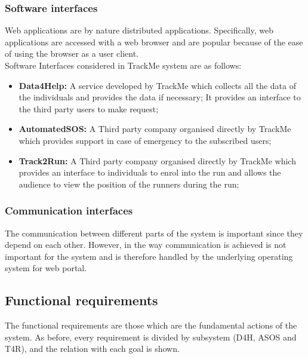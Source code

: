 \documentclass[12pt]{article}
\begin{document}
\subsubsection{Software interfaces}
Web applications are by nature distributed applications. Specifically, web applications are accessed with a web browser and are popular because of the ease of using the browser as a user client.\\
Software Interfaces considered in TrackMe system are as follows:
\begin{itemize}
\item{} \textbf{Data4Help:} A service developed by TrackMe which collects all the data of the individuals and provides the data if necessary; It provides an interface to the third party users to make request;
\item{} \textbf{AutomatedSOS:} A Third party company organised directly by TrackMe which provides support in case of emergency to the subscribed users;
\item{} \textbf{Track2Run:} A Third party company organised directly by TrackMe which provides an interface to individuals to enrol into the run and allows the audience to view the position of the runners during the run;
\end{itemize}

\subsubsection{Communication interfaces}
The communication between different parts of the system is important since they depend on each other. However, in the way communication is achieved is not important for the system and is therefore handled by the underlying operating system for web portal.

\subsection{Functional requirements}
The functional requirements are those which are the fundamental actions of the system. As before, every requirement is divided by subsystem (D4H, ASOS and T4R), and the relation with each goal is shown.
\end{document}
